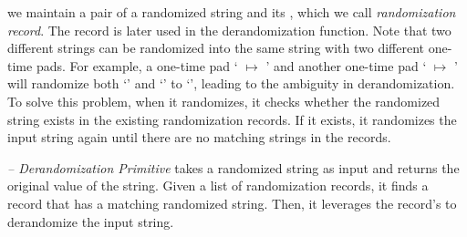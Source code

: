 
%
 we maintain a pair of a randomized string and its , which we call {\it randomization record}. The record is later used in the derandomization function.
Note that two different strings can be randomized into the same string with two different one-time pads. For example, a one-time pad ` $\mapsto$ ' and another one-time pad ` $\mapsto$ ' will randomize both `' and `' to `', leading to the ambiguity in derandomization. %
To solve this problem, when it randomizes, it checks whether the randomized string exists in the existing randomization records. If it exists, it randomizes the input string again until there are no matching strings in the records.



\noindent
{\it -- Derandomization Primitive} takes a randomized string as input and returns the original value of the string. Given a list of randomization records, it finds a record that has a matching randomized string. Then, it leverages the record's  to derandomize the input string. 


